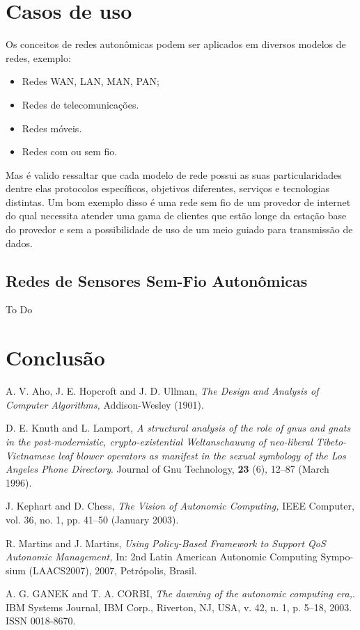 \documentclass[11pt,twoside]{article}
\begin{document}
\section{Casos de uso}
Os conceitos de redes autonômicas podem ser aplicados em diversos modelos de redes, exemplo:
\begin{itemize}
	\item Redes WAN, LAN, MAN, PAN;
	\item Redes de telecomunicações.
	\item Redes móveis.
	\item Redes com ou sem fio.
\end{itemize}
Mas é valido ressaltar que cada modelo de rede possui as suas particularidades dentre elas protocolos específicos, objetivos diferentes, serviços e tecnologias distintas. Um bom exemplo disso é uma rede sem fio de um provedor de internet do qual necessita atender uma gama de clientes que estão longe da estação base do provedor e sem a possibilidade de uso de um meio guiado para transmissão de dados.

\subsection{Redes de Sensores Sem-Fio Autonômicas}
To Do

\section{Conclusão}
\begin{thebibliography}{99}

 A. V. Aho, J. E. Hopcroft and J.  D.  Ullman, {\it The
Design and Analysis of Computer Algorithms,} Addison-Wesley (1901).

 D. E. Knuth and L. Lamport, {\it A structural analysis
of the role of gnus and gnats in the post-modernistic, crypto-existential 
Weltanschauung of neo-liberal Tibeto-Vietnamese leaf blower operators 
as manifest in the sexual symbology of the Los Angeles Phone Directory}.
Journal of Gnu Technology, {\bf 23} (6), 12--87
(March 1996).

 J. Kephart and D. Chess, {\it The Vision of Autonomic 
Computing,} IEEE Computer, vol. 36, no. 1, pp. 41--50
(January 2003).

 R. Martins and J. Martins, {\it Using Policy-Based Framework to Support QoS 
Autonomic Management,} In: 2nd Latin American Autonomic Computing Sympo- sium (LAACS2007), 
2007, Petrópolis, Brasil.

 A. G. GANEK and  T. A. CORBI, {\it The dawning of the autonomic computing era,}. IBM Systems Journal, IBM Corp., Riverton, NJ, USA, v. 42, n. 1, p. 5–18, 2003. ISSN 0018-8670.

\end{thebibliography}
\end{document}
